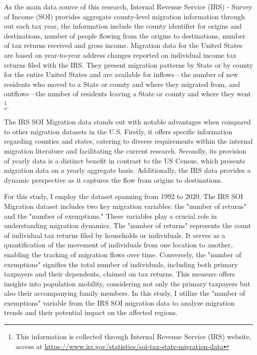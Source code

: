 \documentclass[letterpaper]{article}
\begin{document}
As the main data source of this research, Internal Revenue Service (IRS) - Survey of Income (SOI)  provides aggregate county-level migration information through out each tax year, the information include the county identifier for origins and destinations, number of people flowing from the origins to destinations, number of tax returns received and gross income. Migration data for the United States are based on year-to-year address changes reported on individual income tax returns filed with the IRS. They present migration patterns by State or by county for the entire United States and are available for inflows—the number of new residents who moved to a State or county and where they migrated from, and outflows—the number of residents leaving a State or county and where they went \footnote{This information is collected through Internal Revenue Service (IRS) website, access at \url{https://www.irs.gov/statistics/soi-tax-stats-migration-data}}. 

The IRS SOI Migration data stands out with notable advantages when compared to other migration datasets in the U.S. Firstly, it offers specific information regarding counties and states, catering to diverse requirements within the internal migration literature and facilitating the current research. Secondly, its provision of yearly data is a distinct benefit in contrast to the US Census, which presents migration data on a yearly aggregate basis. Additionally, the IRS data provides a dynamic perspective as it captures the flow from origins to destinations. 

For this study, I employ the dataset spanning from 1992 to 2020. The IRS SOI Migration dataset includes two key migration variables: the "number of returns" and the "number of exemptions." These variables play a crucial role in understanding migration dynamics. The "number of returns" represents the count of individual tax returns filed by households or individuals. It serves as a quantification of the movement of individuals from one location to another, enabling the tracking of migration flows over time. Conversely, the "number of exemptions" signifies the total number of individuals, including both primary taxpayers and their dependents, claimed on tax returns. This measure offers insights into population mobility, considering not only the primary taxpayers but also their accompanying family members. In this study, I utilize the "number of exemptions" variable from the IRS SOI migration data to analyze migration trends and their potential impact on the affected regions.  
\end{document}

